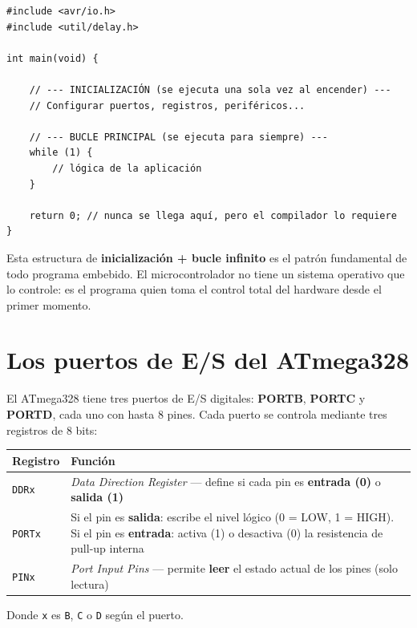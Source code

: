 \begin{lstlisting}[style=estilo-c]
#include <avr/io.h>
#include <util/delay.h>

int main(void) {

    // --- INICIALIZACIÓN (se ejecuta una sola vez al encender) ---
    // Configurar puertos, registros, periféricos...

    // --- BUCLE PRINCIPAL (se ejecuta para siempre) ---
    while (1) {
        // lógica de la aplicación
    }

    return 0; // nunca se llega aquí, pero el compilador lo requiere
}
\end{lstlisting}

Esta estructura de \textbf{inicialización + bucle infinito} es el patrón fundamental de
todo programa embebido. El microcontrolador no tiene un sistema operativo que lo
controle: es el programa quien toma el control total del hardware desde el primer
momento.

\section{Los puertos de E/S del ATmega328}

El ATmega328 tiene tres puertos de E/S digitales: \textbf{PORTB}, \textbf{PORTC} y
\textbf{PORTD}, cada uno con hasta 8 pines. Cada puerto se controla mediante tres
registros de 8 bits:

\begin{table}[H]
\centering
\begin{tabular}{lp{10cm}}
\toprule
\textbf{Registro} & \textbf{Función} \\
\midrule
\texttt{DDRx} & \textit{Data Direction Register} --- define si cada pin es
    \textbf{entrada (0)} o \textbf{salida (1)} \\
\texttt{PORTx} & Si el pin es \textbf{salida}: escribe el nivel lógico
    (0 = LOW, 1 = HIGH). Si el pin es \textbf{entrada}: activa (1) o desactiva (0)
    la resistencia de pull-up interna \\
\texttt{PINx} & \textit{Port Input Pins} --- permite \textbf{leer} el estado actual
    de los pines (solo lectura) \\
\bottomrule
\end{tabular}
\end{table}

Donde \texttt{x} es \texttt{B}, \texttt{C} o \texttt{D} según el puerto.

